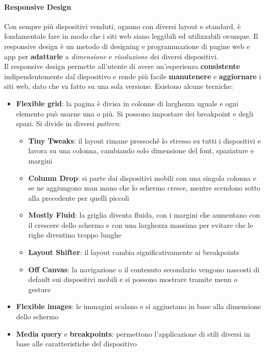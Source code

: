 \paragraph{Responsive Design} Con sempre più dispositivi venduti, ognuno con diversi layout e standard, è fondamentale fare in modo che i siti web siano leggibili ed utilizzabili ovunque. Il responsive design è un metodo di designing e programmazione di pagine web e app per \textbf{adattarle} a \textit{dimensione} e \textit{risoluzione} dei diversi dispositivi.\\
Il responsive design permette all'utente di avere un'esperienza \textbf{consistente} indipendentemente dal dispositivo e rende più facile \textbf{manutenere} e \textbf{aggiornare} i siti web, dato che va fatto su una sola versione. Esistono alcune tecniche:
\begin{itemize}
	\item \textbf{Flexible grid}: la pagina è divisa in colonne di larghezza uguale e ogni elemento può usarne una o più. Si possono impostare dei breakpoint e degli spazi. Si divide in diversi \textit{pattern}:
	\begin{itemize}
		\item \textbf{Tiny Tweaks}: il layout rimane pressoché lo stresso su tutti i dispositivi e lavora su una colonna, cambiando solo dimensione del font, spaziature e margini
		\item \textbf{Column Drop}: si parte dai dispositivi mobili con una singola colonna e se ne aggiungono man mano che lo schermo cresce, mentre scendono sotto alla precedente per quelli piccoli
		\item \textbf{Mostly Fluid}: la griglia diventa fluida, con i margini che aumentano con il crescere dello schermo e con una larghezza massima per evitare che le righe diventino troppo lunghe
		\item \textbf{Layout Shifter}: il layout cambia significativamente ai breakpoints
		\item \textbf{Off Canvas}: la navigazione o il contenuto secondario vengono nascosti di default sui dispositivi mobili e si possono mostrare tramite menu o gesture
	\end{itemize}
	\item \textbf{Flexible images}: le immagini scalano e si aggiustano in base alla dimensione dello schermo
	\item \textbf{Media query} e \textbf{breakpoints}: permettono l'applicazione di stili diversi in base alle caratteristiche del dispositivo
\end{itemize}

